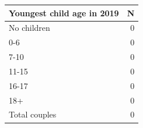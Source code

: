 
\begin{tabular}{lr}
\toprule
Youngest child age in 2019 & N\\
\midrule
No children & 0\\
0-6 & 0\\
7-10 & 0\\
11-15 & 0\\
16-17 & 0\\
18+ & 0\\
Total couples & 0\\
\bottomrule
\end{tabular}
